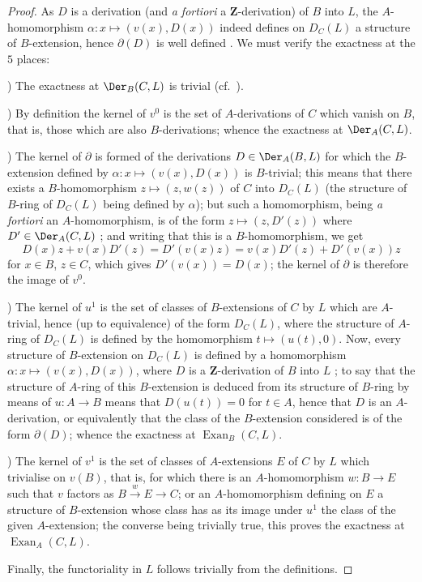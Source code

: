 \begin{proof}
As $D$ is a derivation (and \emph{a fortiori} a $\mathbf{Z}$-derivation) of $B$ into $L$, the $A$-homomorphism $\alpha:x\mapsto(v(x),D(x))$ indeed defines on $D_C(L)$ a structure of $B$-extension, hence $\partial(D)$ is well defined .
We must verify the exactness at the $5$ places:

\medskip
{})\enspace
The exactness at $\Der_B(C,L)$ is trivial (cf.\ ).

\medskip
{})\enspace
By definition  the kernel of $v^0$ is the set of $A$-derivations of $C$ which vanish on $B$, that is, those which are also $B$-derivations; whence the exactness at $\Der_A(C,L)$.

\medskip
{})\enspace
The kernel of $\partial$ is formed of the derivations $D\in\Der_A(B,L)$ for which the $B$-extension defined by $\alpha:x\mapsto(v(x),D(x))$ is $B$-trivial; this means  that there exists a $B$-homomorphism $z\mapsto(z,w(z))$ of $C$ into $D_C(L)$ (the structure of $B$-ring of $D_C(L)$ being defined by $\alpha$); but such a homomorphism, being \emph{a fortiori} an $A$-homomorphism, is of the form $z\mapsto(z,D'(z))$ where $D'\in\Der_A(C,L)$ ; and writing that this is a $B$-homomorphism, we get
\[
  D(x)z+v(x)D'(z) = D'(v(x)z) = v(x)D'(z)+D'(v(x))z
\]
for $x\in B$, $z\in C$, which gives $D'(v(x))=D(x)$; the kernel of $\partial$ is therefore the image of $v^0$.

\medskip
{})\enspace
The kernel of $u^1$ is the set of classes of $B$-extensions of $C$ by $L$ which are $A$-trivial, hence (up to equivalence) of the form $D_C(L)$, where the structure of $A$-ring of $D_C(L)$ is defined by the homomorphism $t\mapsto(u(t),0)$.
Now, every structure of $B$-extension on $D_C(L)$ is defined by a homomorphism $\alpha:x\mapsto(v(x),D(x))$, where $D$ is a $\mathbf{Z}$-derivation of $B$ into $L$ ; to say that the structure of $A$-ring of this $B$-extension is deduced from its structure of $B$-ring by means of $u:A\to B$ means that $D(u(t))=0$ for $t\in A$, hence that $D$ is an $A$-derivation, or equivalently that the class of the $B$-extension considered is of the form $\partial(D)$; whence the exactness at $\operatorname{Exan}_B(C,L)$.

\medskip
{})\enspace
The kernel of $v^1$ is the set of classes of $A$-extensions $E$ of $C$ by $L$ which trivialise on $v(B)$, that is, for which there is an $A$-homomorphism $w:B\to E$ such that $v$ factors as $B\xrightarrow{w}E\to C$; or an $A$-homomorphism defining on $E$ a structure of $B$-extension whose class has as its image under $u^1$ the class of the given $A$-extension; the converse being trivially true, this proves the exactness at $\operatorname{Exan}_A(C,L)$.

Finally, the functoriality in $L$ follows trivially from the definitions.
\end{proof}

